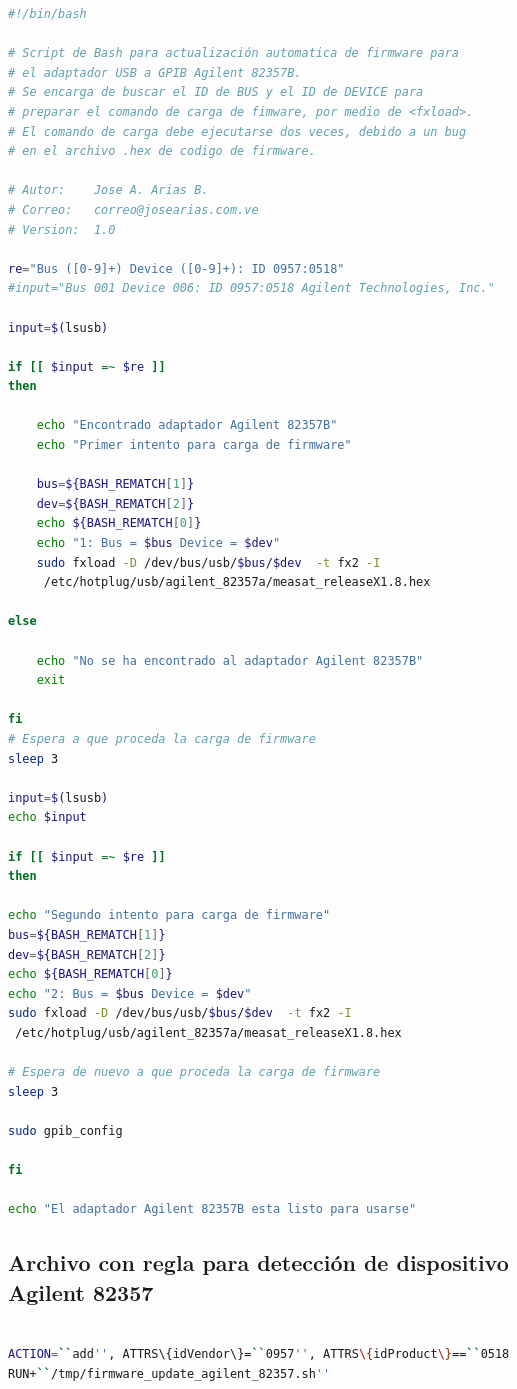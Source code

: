 \documentclass[paper=letter,oneside,fontsize=11pt, parskip=full]{scrartcl}
\begin{document}
	\begin{lstlisting}[language=bash,caption={firmware\_update\_agilent\_82357.sh}]
#!/bin/bash 

# Script de Bash para actualización automatica de firmware para 
# el adaptador USB a GPIB Agilent 82357B.
# Se encarga de buscar el ID de BUS y el ID de DEVICE para 
# preparar el comando de carga de fimware, por medio de <fxload>. 
# El comando de carga debe ejecutarse dos veces, debido a un bug 
# en el archivo .hex de codigo de firmware.

# Autor: 	Jose A. Arias B.
# Correo: 	correo@josearias.com.ve
# Version:	1.0

re="Bus ([0-9]+) Device ([0-9]+): ID 0957:0518"
#input="Bus 001 Device 006: ID 0957:0518 Agilent Technologies, Inc."

input=$(lsusb)

if [[ $input =~ $re ]] 
then 

	echo "Encontrado adaptador Agilent 82357B"
	echo "Primer intento para carga de firmware"

	bus=${BASH_REMATCH[1]}
	dev=${BASH_REMATCH[2]}
	echo ${BASH_REMATCH[0]}
	echo "1: Bus = $bus Device = $dev"
	sudo fxload -D /dev/bus/usb/$bus/$dev  -t fx2 -I 
	 /etc/hotplug/usb/agilent_82357a/measat_releaseX1.8.hex

else 

	echo "No se ha encontrado al adaptador Agilent 82357B"
	exit

fi
# Espera a que proceda la carga de firmware
sleep 3

input=$(lsusb)
echo $input

if [[ $input =~ $re ]]
then

echo "Segundo intento para carga de firmware"
bus=${BASH_REMATCH[1]}
dev=${BASH_REMATCH[2]}
echo ${BASH_REMATCH[0]}
echo "2: Bus = $bus Device = $dev"
sudo fxload -D /dev/bus/usb/$bus/$dev  -t fx2 -I
 /etc/hotplug/usb/agilent_82357a/measat_releaseX1.8.hex

# Espera de nuevo a que proceda la carga de firmware
sleep 3

sudo gpib_config

fi

echo "El adaptador Agilent 82357B esta listo para usarse"
	\end{lstlisting}	
	
	\subsection{Archivo con regla para detección de dispositivo Agilent 82357}

	\begin{lstlisting}[language=bash,caption={agilent\_82357.rules}]
	
ACTION=``add'', ATTRS\{idVendor\}=``0957'', ATTRS\{idProduct\}==``0518'', 
RUN+``/tmp/firmware_update_agilent_82357.sh''
	
	\end{lstlisting}
		
\end{document}
